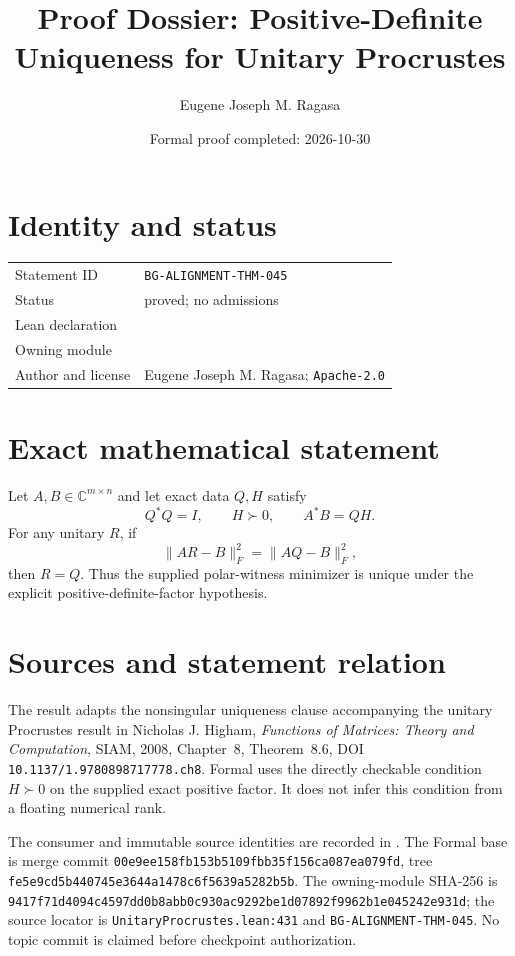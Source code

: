 \documentclass[10pt]{article}
\title{Proof Dossier: Positive-Definite Uniqueness for Unitary Procrustes}
\author{Eugene Joseph M. Ragasa}
\date{Formal proof completed: 2026-10-30}
\begin{document}
\raggedright
\maketitle

\section{Identity and status}
\begin{tabularx}{\textwidth}{@{}lY@{}}
\toprule
Statement ID & \texttt{BG-ALIGNMENT-THM-045} \\
Status & proved; no admissions \\
Lean declaration &  \\
Owning module &  \\
Author and license & Eugene Joseph M. Ragasa; \texttt{Apache-2.0} \\
\bottomrule
\end{tabularx}

\section{Exact mathematical statement}
Let $A,B\in\mathbb C^{m\times n}$ and let exact data $Q,H$ satisfy
\[
  Q^*Q=I,\qquad H\succ0,\qquad A^*B=QH.
\]
For any unitary $R$, if
\[
  \lVert AR-B\rVert_F^2=\lVert AQ-B\rVert_F^2,
\]
then $R=Q$. Thus the supplied polar-witness minimizer is unique under the explicit
positive-definite-factor hypothesis.

\section{Sources and statement relation}
The result adapts the nonsingular uniqueness clause accompanying the unitary Procrustes result in
Nicholas J. Higham, \emph{Functions of Matrices: Theory and Computation}, SIAM, 2008,
Chapter~8, Theorem~8.6, DOI \texttt{10.1137/1.9780898717778.ch8}. Formal uses the directly
checkable condition $H\succ0$ on the supplied exact positive factor. It does not infer this
condition from a floating numerical rank.

The consumer and immutable source identities are recorded in . The
Formal base is merge commit \texttt{00e9ee158fb153b5109fbb35f156ca087ea079fd}, tree
\texttt{fe5e9cd5b440745e3644a1478c6f5639a5282b5b}. The owning-module SHA-256 is
\texttt{9417f71d4094c4597dd0b8abb0c930ac9292be1d07892f9962b1e045242e931d}; the source locator is
\texttt{UnitaryProcrustes.lean:431} and \texttt{BG-ALIGNMENT-THM-045}. No topic commit is claimed
before checkpoint authorization.
\end{document}
